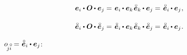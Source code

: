 \nopagebreak\vspace{-0.2em}\begin{equation}\label{componentsofrotationtensor}
\begin{array}{c}
\bm{e}_{i} \dotp \rotationtensor \hspace{-0.1ex} \dotp \bm{e}_{j} =
\hspace{.2ex} \tikzmark{beginEqualsKroneckerDeltaPresent} \bm{e}_{i} \hspace{-0.1ex} \dotp \bm{e}_{k} \tikzmark{endEqualsKroneckerDeltaPresent} \hspace{.2ex} \mathcircabove{\bm{e}}_{k} \hspace{-0.1ex} \dotp \bm{e}_{j} =
\hspace{.2ex} \mathcircabove{\bm{e}}_{i} \hspace{-0.1ex} \dotp \bm{e}_{j}
\hspace{.1ex} ,
\\[1.4em]
%
\mathcircabove{\bm{e}}_{i} \dotp \rotationtensor \hspace{-0.1ex} \dotp \mathcircabove{\bm{e}}_{j} =
\hspace{.2ex} \mathcircabove{\bm{e}}_{i} \hspace{-0.1ex} \dotp \bm{e}_{k} \hspace{.2ex} \tikzmark{beginEqualsKroneckerDeltaPast} \mathcircabove{\bm{e}}_{k} \hspace{-0.1ex} \dotp \mathcircabove{\bm{e}}_{j} \tikzmark{endEqualsKroneckerDeltaPast} =
\hspace{.2ex} \mathcircabove{\bm{e}}_{i} \hspace{-0.1ex} \dotp \bm{e}_{j}
\hspace{.1ex} .
\end{array}
\end{equation}

\vspace{.4em}\noindent
{}\en{,}
~${\cosinematrix{\!j\mathcircabove{i}} = \hspace{.1ex} \mathcircabove{\bm{e}}_i \dotp \bm{e}_j}$\hspace{.1ex}:

